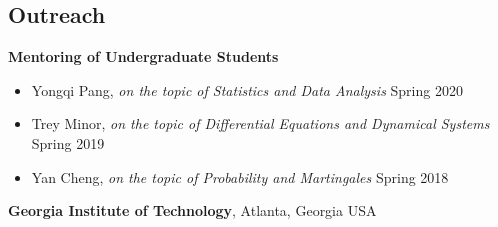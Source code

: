 \documentclass[margin,line]{res}
\begin{document}
\begin{resume}
\section{\sc Outreach}

{\bf Mentoring of Undergraduate Students}
\vvspace

\begin{itemize}[leftmargin=0.15in, label=$\sqbullet$]
    \item Yongqi Pang, \textit{on the topic of Statistics and Data Analysis} \hfill Spring 2020
    \item Trey Minor, \textit{on the topic of Differential Equations and Dynamical Systems} \hfill Spring 2019
    \item Yan Cheng, \textit{on the topic of Probability and Martingales} \hfill Spring 2018
\end{itemize}



\iffalse







{\bf Georgia Institute of Technology}, Atlanta, Georgia USA


\end{resume}
\end{document}
